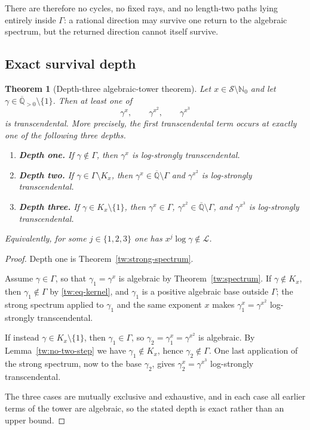 \documentclass[11pt,oneside]{article}
\newtheorem{theorem}{Theorem}[section]
\theoremstyle{definition}
\theoremstyle{remark}
\newcommand{\Nzero}{\mathbb N_0}
\newcommand{\Abar}{\overline{\mathbb Q}}
\newcommand{\Sol}{\mathcal S}
\newcommand{\Apos}{\Abar_{>0}}
\newcommand{\LL}{\mathcal L}
\newcommand{\GammaSat}{\Gamma}
\begin{document}
There are therefore no cycles, no fixed rays, and no length-two paths lying entirely inside
$\GammaSat$: a rational direction may survive one return to the algebraic spectrum, but the
returned direction cannot itself survive.

\subsection{Exact survival depth}

\begin{theorem}[Depth-three algebraic-tower theorem]
\label{tw:depth-three}
Let $x\in\Sol\setminus\Nzero$ and let $\gamma\in\Apos\setminus\{1\}$.  Then at least one of
\[
 \gamma^x,\qquad\gamma^{x^2},\qquad\gamma^{x^3}
\]
is transcendental.  More precisely, the first transcendental term occurs at exactly one of
the following three depths.
\begin{enumerate}[label=\textup{(\arabic*)}]
\item \textbf{Depth one.}  If $\gamma\notin\GammaSat$, then $\gamma^x$ is log-strongly
transcendental.
\item \textbf{Depth two.}  If $\gamma\in\GammaSat\setminus K_x$, then
$\gamma^x\in\Abar\setminus\GammaSat$ and $\gamma^{x^2}$ is log-strongly transcendental.
\item \textbf{Depth three.}  If $\gamma\in K_x\setminus\{1\}$, then $\gamma^x\in\GammaSat$,
$\gamma^{x^2}\in\Abar\setminus\GammaSat$, and $\gamma^{x^3}$ is log-strongly transcendental.
\end{enumerate}
Equivalently, for some $j\in\{1,2,3\}$ one has $x^j\log\gamma\notin\LL$.
\end{theorem}

\begin{proof}
Depth one is Theorem~\ref{tw:strong-spectrum}.

Assume $\gamma\in\GammaSat$, so that $\gamma_1=\gamma^x$ is algebraic by
Theorem~\ref{tw:spectrum}.  If $\gamma\notin K_x$, then $\gamma_1\notin\GammaSat$ by
\eqref{tw:eq-kernel}, and $\gamma_1$ is a positive algebraic base outside $\GammaSat$; the
strong spectrum applied to $\gamma_1$ and the same exponent $x$ makes
$\gamma_1^x=\gamma^{x^2}$ log-strongly transcendental.

If instead $\gamma\in K_x\setminus\{1\}$, then $\gamma_1\in\GammaSat$, so
$\gamma_2=\gamma_1^x=\gamma^{x^2}$ is algebraic.  By Lemma~\ref{tw:no-two-step} we have
$\gamma_1\notin K_x$, hence $\gamma_2\notin\GammaSat$.  One last application of the strong
spectrum, now to the base $\gamma_2$, gives $\gamma_2^x=\gamma^{x^3}$ log-strongly
transcendental.

The three cases are mutually exclusive and exhaustive, and in each case all earlier terms of
the tower are algebraic, so the stated depth is exact rather than an upper bound.
\end{proof}
\end{document}
